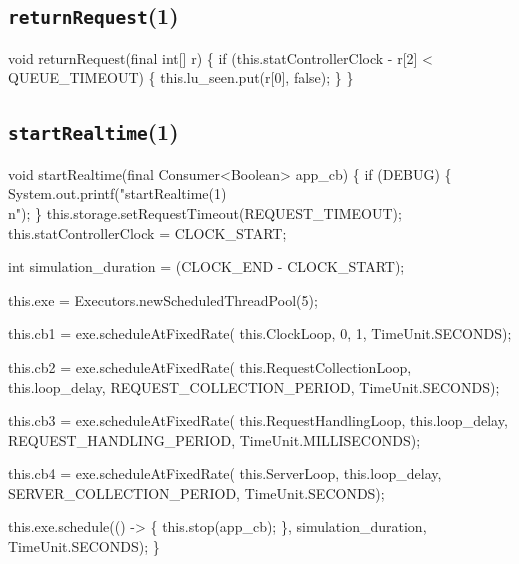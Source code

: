 \subsection{\texttt{returnRequest}(1)}
\nwenddocs{}\endmoddef{}
void returnRequest(final int[] r) \{
  if (this.statControllerClock - r[2] < QUEUE_TIMEOUT) \{
    this.lu_seen.put(r[0], false);
  \}
\}
\eatline
{}\nwendcode{}\nwdocspar
\subsection{\texttt{startRealtime}(1)}
\nwenddocs{}\endmoddef{}
void startRealtime(final Consumer<Boolean> app_cb) \{
  if (DEBUG) \{
    System.out.printf("startRealtime(1)\\n");
  \}
  this.storage.setRequestTimeout(REQUEST_TIMEOUT);
  this.statControllerClock = CLOCK_START;

  int simulation_duration = (CLOCK_END - CLOCK_START);

  this.exe = Executors.newScheduledThreadPool(5);

  this.cb1 = exe.scheduleAtFixedRate(
    this.ClockLoop, 0, 1, TimeUnit.SECONDS);

  this.cb2 = exe.scheduleAtFixedRate(
    this.RequestCollectionLoop, this.loop_delay, REQUEST_COLLECTION_PERIOD, TimeUnit.SECONDS);

  this.cb3 = exe.scheduleAtFixedRate(
    this.RequestHandlingLoop, this.loop_delay, REQUEST_HANDLING_PERIOD, TimeUnit.MILLISECONDS);

  this.cb4 = exe.scheduleAtFixedRate(
    this.ServerLoop, this.loop_delay, SERVER_COLLECTION_PERIOD, TimeUnit.SECONDS);

  this.exe.schedule(() -> \{
    this.stop(app_cb);
  \}, simulation_duration, TimeUnit.SECONDS);
\}
\eatline
{}\nwendcode{}\nwdocspar
